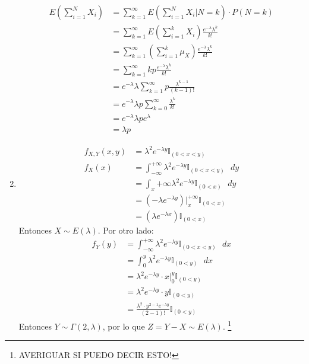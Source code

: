 \begin{enumerate}
		\begin{align*}
			E\left(\sum_{i=1}^{N}X_i\right)	& = \sum_{k=1}^{\infty} E\left(\sum_{i=1}^{N}X_i \Big| N=k\right) \cdot P(N=k)					\\
											& = \sum_{k=1}^{\infty} E\left(\sum_{i=1}^{k}X_i \right) \frac{e^{-\lambda}\lambda^k}{k!}		\\
											& = \sum_{k=1}^{\infty} \left(\sum_{i=1}^{k}\mu_X \right) \frac{e^{-\lambda}\lambda^k}{k!}		\\
											& = \sum_{k=1}^{\infty} kp \frac{e^{-\lambda}\lambda^k}{k!}						\\
											& = e^{-\lambda}\lambda \sum_{k=1}^{\infty} p \frac{\lambda^{k-1}}{(k-1)!}		\\
											& = e^{-\lambda}\lambda p\sum_{k=0}^{\infty} \frac{\lambda^k}{k!}				\\
											& = e^{-\lambda}\lambda p e^{\lambda}											\\
											& = \lambda p
		\end{align*}
	\item
		\begin{align*}
			f_{X,Y}(x,y)	& = \lambda^2e^{-\lambda y} \mathbb{I}_{(0<x<y)}	\\
			f_X(x)			& = \int_{-\infty}^{+\infty}\lambda^2e^{-\lambda y} \mathbb{I}_{(0<x<y)}\text{ }dy	\\
							& = \int_{x}{+\infty}\lambda^2e^{-\lambda y} \mathbb{I}_{(0<x)}\text{ }dy			\\
							& = (-\lambda e^{-\lambda y})\Big|_{x}^{+\infty} \mathbb{I}_{(0<x)}		\\
							& = (\lambda e^{-\lambda x}) \mathbb{I}_{(0<x)}
		\end{align*}
		Entonces $X\sim E(\lambda)$.
		Por otro lado:
		\begin{align*}
			f_Y(y)	& = \int_{-\infty}^{+\infty}\lambda^2e^{-\lambda y} \mathbb{I}_{(0<x<y)}\text{ }dx	\\
					& = \int_0^y\lambda^2e^{-\lambda y} \mathbb{I}_{(0<y)}\text{ }dx					\\
					& = \lambda^2e^{-\lambda y}\cdot x\Big|_0^y \mathbb{I}_{(0<y)}						\\
					& = \lambda^2e^{-\lambda y}\cdot y \mathbb{I}_{(0<y)}								\\
					& = \frac{\lambda^2\cdot y^{2-1} e^{-\lambda y}}{(2-1)!} \mathbb{I}_{(0<y)}
		\end{align*}
		Entonces $Y\sim \Gamma(2, \lambda)$, por lo que $Z = Y-X \sim E(\lambda)$. \footnote{AVERIGUAR SI PUEDO DECIR ESTO!}

\end{enumerate}
